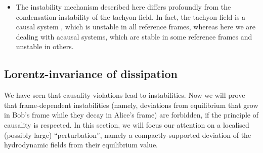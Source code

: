 \documentclass[a4paper, amsfonts, amssymb, amsmath, reprint, showkeys,  twoside, onecolumn,notitlepage,nofootinbib]{revtex4-1}
\newcommand{\spc}{\quad \quad \quad}
\theoremstyle{definition}
\theoremstyle{theorem}
\begin{document}
\begin{itemize}
\begin{equation}
\tilde{g}^{ab} = g^{ab} + (1-w^{2})u_A^a u_A^b \spc (u_A^a = \text{Alice's four-velocity}).
\end{equation}
We will explore this point in more detail in section \ref{unishiipunti}.
\item The instability mechanism described here differs profoundly from the condensation instability of the tachyon field. In fact, the tachyon field is a causal system \cite{Susskind1969}, which is unstable in all reference frames, whereas here we are dealing with acausal systems, which are stable in some reference frames and unstable in others.
\end{itemize}

\subsection{Lorentz-invariance of dissipation}\label{sez3}


We have seen that causality violations lead to instabilities. Now we will prove that frame-dependent instabilities (namely, deviations from equilibrium that grow in Bob's frame while they decay in Alice's frame) are forbidden, if the principle of causality is respected. In this section, we will focus our attention on a localised (possibly large) ``perturbation'', namely a compactly-supported deviation of the hydrodynamic fields from their equilibrium value.
\end{document}
